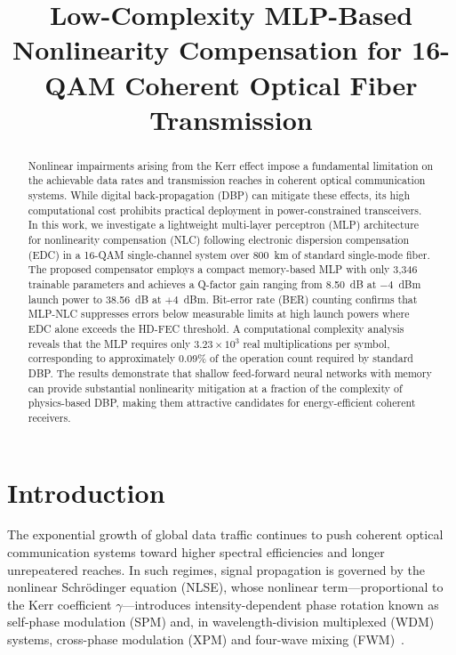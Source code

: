 \documentclass[conference]{IEEEtran}
\begin{document}
\title{Low-Complexity MLP-Based Nonlinearity Compensation for 16-QAM Coherent Optical Fiber Transmission}

\author{
}

\maketitle

\begin{abstract}
Nonlinear impairments arising from the Kerr effect impose a fundamental limitation on the achievable data rates and transmission reaches in coherent optical communication systems. While digital back-propagation (DBP) can mitigate these effects, its high computational cost prohibits practical deployment in power-constrained transceivers. In this work, we investigate a lightweight multi-layer perceptron (MLP) architecture for nonlinearity compensation (NLC) following electronic dispersion compensation (EDC) in a 16-QAM single-channel system over 800~km of standard single-mode fiber. The proposed compensator employs a compact memory-based MLP with only 3,346 trainable parameters and achieves a Q-factor gain ranging from 8.50~dB at $-4$~dBm launch power to 38.56~dB at $+4$~dBm. Bit-error rate (BER) counting confirms that MLP-NLC suppresses errors below measurable limits at high launch powers where EDC alone exceeds the HD-FEC threshold. A computational complexity analysis reveals that the MLP requires only $3.23 \times 10^3$ real multiplications per symbol, corresponding to approximately 0.09\% of the operation count required by standard DBP. The results demonstrate that shallow feed-forward neural networks with memory can provide substantial nonlinearity mitigation at a fraction of the complexity of physics-based DBP, making them attractive candidates for energy-efficient coherent receivers.
\end{abstract}

\section{Introduction}
\label{sec:introduction}

The exponential growth of global data traffic continues to push coherent optical communication systems toward higher spectral efficiencies and longer unrepeatered reaches. In such regimes, signal propagation is governed by the nonlinear Schr\"{o}dinger equation (NLSE), whose nonlinear term---proportional to the Kerr coefficient $\gamma$---introduces intensity-dependent phase rotation known as self-phase modulation (SPM) and, in wavelength-division multiplexed (WDM) systems, cross-phase modulation (XPM) and four-wave mixing (FWM)~\cite{agrawal2001}.
\end{document}
